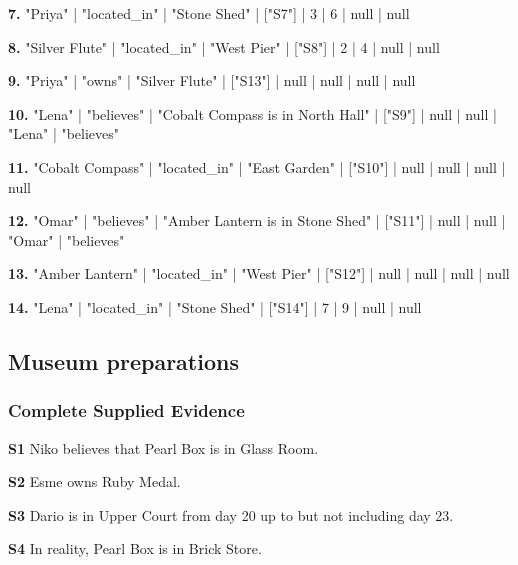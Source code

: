 \noindent\textbf{7.} "Priya" | "located\_in" | "Stone Shed" | ["S7"] | 3 | 6 | null | null\par\smallskip

\noindent\textbf{8.} "Silver Flute" | "located\_in" | "West Pier" | ["S8"] | 2 | 4 | null | null\par\smallskip

\noindent\textbf{9.} "Priya" | "owns" | "Silver Flute" | ["S13"] | null | null | null | null\par\smallskip

\noindent\textbf{10.} "Lena" | "believes" | "Cobalt Compass is in North Hall" | ["S9"] | null | null | "Lena" | "believes"\par\smallskip

\noindent\textbf{11.} "Cobalt Compass" | "located\_in" | "East Garden" | ["S10"] | null | null | null | null\par\smallskip

\noindent\textbf{12.} "Omar" | "believes" | "Amber Lantern is in Stone Shed" | ["S11"] | null | null | "Omar" | "believes"\par\smallskip

\noindent\textbf{13.} "Amber Lantern" | "located\_in" | "West Pier" | ["S12"] | null | null | null | null\par\smallskip

\noindent\textbf{14.} "Lena" | "located\_in" | "Stone Shed" | ["S14"] | 7 | 9 | null | null\par\smallskip

\clearpage\subsection*{Museum preparations}

\subsubsection*{Complete Supplied Evidence}

\noindent\textbf{S1} Niko believes that Pearl Box is in Glass Room.\par\smallskip

\noindent\textbf{S2} Esme owns Ruby Medal.\par\smallskip

\noindent\textbf{S3} Dario is in Upper Court from day 20 up to but not including day 23.\par\smallskip

\noindent\textbf{S4} In reality, Pearl Box is in Brick Store.\par\smallskip

